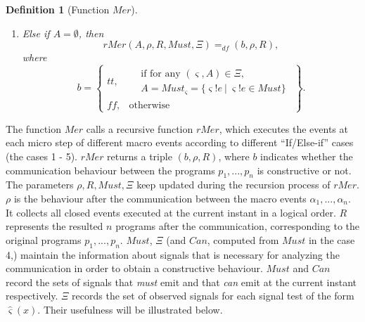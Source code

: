 \documentclass{fcs}
\newtheorem{mydef}{Definition}[section]
\newcommand{\sig}[0]{\varsigma}
\newcommand{\halt}[0]{\mathbf{0}}
\newcommand{\true}[0]{\mathit{tt}}
\newcommand{\false}[0]{\mathit{ff}}
\DeclareMathOperator{\seq}{;}
\newcommand{\Must}[0]{\mathit{Must}}
\newcommand{\Match}[0]{\mathit{Mat}}
\DeclareMathOperator{\sep}{|}
\DeclareMathOperator{\nex}{.}
\newcommand{\Merge}[0]{\mathit{Mer}}
\newcommand{\rMerge}[0]{\mathit{rMer}}
\newcommand{\SV}[0]{\Xi}
\newcommand{\Can}[0]{\mathit{Can}}
\newcommand{\dddef}[0]{=_{df}}
\begin{document}
\begin{mydef}[Function $\Merge$]
\begin{enumerate}
\begin{enumerate}[(i)]
        \item else if $\Match(\varrho_j, \Must)=\false$ for all $1\le j\le n$, then
        $$\begin{aligned}
        \rMerge&((p_1\sep ...\sep \varrho_j\nex \beta_j\seq q_{j}\sep...\sep p_n),
        \rho, R, \Must,  \SV)
        \dddef\\
        &\rMerge(\emptyset,
        \halt, R, \Must,  \SV)
        ,
        \end{aligned}
        $$

        \item otherwise,
        $$\rMerge((p_1\sep ...\sep p_n),
        \rho, R, \Must, \SV)
        \dddef
        (\false, \rho, R)
        .
        $$

        \end{enumerate}

        \item Else if $A = \emptyset$, then
        $$\rMerge(
        A, \rho, R, \Must, \SV)
        \dddef
        (b, \rho, R),
        $$
        where
        $$
        b = \left\{\begin{array}{ll}
            \true , &\begin{aligned}&\mbox{if for any $(\sig, A)\in \SV$}, \\ &A = \Must_\sig = \{\sig!e\ |\ \sig!e\in \Must\}\end{aligned}\\
            \false, &\mbox{otherwise}
        \end{array}
        \right\}.
        $$
    \end{enumerate}



\end{mydef}

The function $\Merge$ calls a recursive function $\rMerge$, which executes the events at each micro step of different macro events according to different ``If/Else-if'' cases (the cases 1 - 5).
$\rMerge$ returns a triple $(b, \rho, R)$, where $b$ indicates whether the communication behaviour between the programs $p_1,...,p_n$ is constructive or not.
The parameters $\rho, R, \Must, \SV$ keep updated during the recursion process of $\rMerge$.
$\rho$ is the behaviour after the communication between the macro events $\alpha_1,...,\alpha_n$.
It collects all closed events executed at the current instant in a logical order.
$R$ represents the resulted $n$ programs after the communication, corresponding to the original programs $p_1,...,p_n$.
$\Must$, $\SV$ (and $\Can$, computed from $\Must$ in the case 4,) maintain the information about signals that is necessary for analyzing the communication in order to obtain a constructive behaviour.
$\Must$ and $\Can$ record the sets of signals that \emph{must} emit and that \emph{can} emit at the current instant respectively.
$\SV$ records the set of observed signals for each signal test of the form $\hat{\sig}(x)$.
Their usefulness will be illustrated below.
\end{document}

